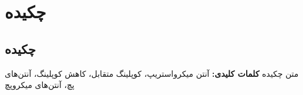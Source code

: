 \chapter*{چکیده}
\thispagestyle{empty}
\section*{چکیده}
متن چکیده
\textbf{
کلمات کلیدی:
}
آنتن میکرواستریپ، کوپلینگ متقابل، کاهش کوپلینگ، آنتن‌های پچ، آنتن‌های میکروپچ


